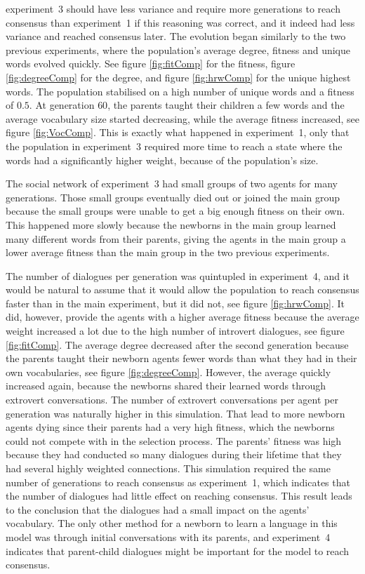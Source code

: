 experiment~3 should have less variance and require more generations to reach consensus than experiment~1 if this reasoning was correct, and it indeed had less variance and reached consensus later. The evolution began similarly to the two previous experiments, where the population's average degree, fitness and unique words evolved quickly. See figure \ref{fig:fitComp} for the fitness, figure \ref{fig:degreeComp} for the degree, and figure \ref{fig:hrwComp} for the unique highest words. The population stabilised on a high number of unique words and a fitness of $0.5$. At generation $60$, the parents taught their children a few words and the average vocabulary size started decreasing, while the average fitness increased, see figure \ref{fig:VocComp}. This is exactly what happened in experiment~1, only that the population in experiment~3 required more time to reach a state where the words had a significantly higher weight, because of the population’s size. 

The social network of experiment~3 had small groups of two agents for many generations. Those small groups eventually died out or joined the main group because the small groups were unable to get a big enough fitness on their own. This happened more slowly because the newborns in the main group learned many different words from their parents, giving the agents in the main group a lower average fitness than the main group in the two previous experiments.

The number of dialogues per generation was quintupled in experiment~4, and it would be natural to assume that it would allow the population to reach consensus faster than in the main experiment, but it did not, see figure \ref{fig:hrwComp}. It did, however, provide the agents with a higher average fitness because the average weight increased a lot due to the high number of introvert dialogues, see figure \ref{fig:fitComp}. The average degree decreased after the second generation because the parents taught their newborn agents fewer words than what they had in their own vocabularies, see figure \ref{fig:degreeComp}. However, the average quickly increased again, because the newborns shared their learned words through extrovert conversations. The number of extrovert conversations per agent per generation was naturally higher in this simulation. That lead to more newborn agents dying since their parents had a very high fitness, which the newborns could not compete with in the selection process. The parents' fitness was high because they had conducted so many dialogues during their lifetime that they had several highly weighted connections. This simulation required the same number of generations to reach consensus as experiment~1, which indicates that the number of dialogues had little effect on reaching consensus. This result leads to the conclusion that the dialogues had a small impact on the agents' vocabulary. The only other method for a newborn to learn a language in this model was through initial conversations with its parents, and experiment~4 indicates that parent-child dialogues might be important for the model to reach consensus.  

